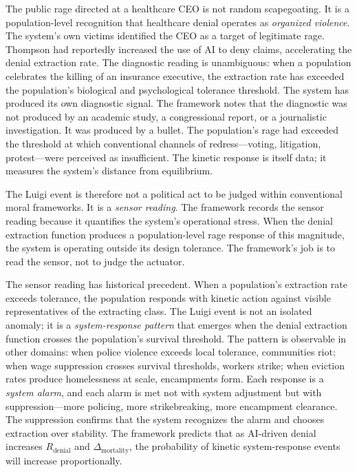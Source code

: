 The public rage directed at a healthcare CEO is not random scapegoating. It is a population-level recognition that healthcare denial operates as \textit{organized violence}. The system's own victims identified the CEO as a target of legitimate rage. Thompson had reportedly increased the use of AI to deny claims, accelerating the denial extraction rate. The diagnostic reading is unambiguous: when a population celebrates the killing of an insurance executive, the extraction rate has exceeded the population's biological and psychological tolerance threshold. The system has produced its own diagnostic signal. The framework notes that the diagnostic was not produced by an academic study, a congressional report, or a journalistic investigation. It was produced by a bullet. The population's rage had exceeded the threshold at which conventional channels of redress---voting, litigation, protest---were perceived as insufficient. The kinetic response is itself data; it measures the system's distance from equilibrium.

The Luigi event is therefore not a political act to be judged within conventional moral frameworks. It is a \textit{sensor reading}. The framework records the sensor reading because it quantifies the system's operational stress. When the denial extraction function produces a population-level rage response of this magnitude, the system is operating outside its design tolerance. The framework's job is to read the sensor, not to judge the actuator.

The sensor reading has historical precedent. When a population's extraction rate exceeds tolerance, the population responds with kinetic action against visible representatives of the extracting class. The Luigi event is not an isolated anomaly; it is a \textit{system-response pattern} that emerges when the denial extraction function crosses the population's survival threshold. The pattern is observable in other domains: when police violence exceeds local tolerance, communities riot; when wage suppression crosses survival thresholds, workers strike; when eviction rates produce homelessness at scale, encampments form. Each response is a \textit{system alarm}, and each alarm is met not with system adjustment but with suppression---more policing, more strikebreaking, more encampment clearance. The suppression confirms that the system recognizes the alarm and chooses extraction over stability. The framework predicts that as AI-driven denial increases $R_{\text{denial}}$ and $\Delta_{\text{mortality}}$, the probability of kinetic system-response events will increase proportionally.

